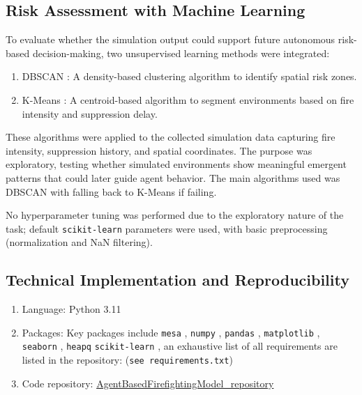 \documentclass[twoside]{article}
\begin{document}
\subsection{Risk Assessment with Machine Learning}

To evaluate whether the simulation output could support future autonomous risk-based decision-making, two unsupervised learning methods were integrated: 
\begin{enumerate}
    \item DBSCAN \citep{dbscan}: A density-based clustering algorithm to identify spatial risk zones.
    \item K-Means \citep{kmeans}: A centroid-based algorithm to segment environments based on fire intensity and suppression delay.
\end{enumerate}

These algorithms were applied to the collected simulation data capturing fire intensity, suppression history, and spatial coordinates. The purpose was exploratory, testing whether simulated environments show meaningful emergent patterns that could later guide agent behavior. The main algorithms used was DBSCAN with falling back to K-Means if failing.

No hyperparameter tuning was performed due to the exploratory nature of the task; default \texttt{scikit-learn} parameters were used, with basic preprocessing (normalization and NaN filtering).

\subsection{Technical Implementation and Reproducibility}

\begin{enumerate}
    \item Language: Python 3.11 \citep{python3.11}
    \item Packages: Key packages include \texttt{mesa} \citep{terMesa}, \texttt{numpy} \citep{numpy}, \texttt{pandas} \citep{reback2020pandas}, \texttt{matplotlib} \citep{Matplotlib}, \texttt{seaborn} \citep{seaborn} , \texttt{heapq} \citep{python-heapq} \texttt{scikit-learn} \citep{scikit-learn}, an exhaustive list of all requirements are listed in the repository: (\texttt{see requirements.txt})
    \item Code repository: \href{https://github.com/kaispeidel/thesis}{AgentBasedFirefightingModel\_repository} \citep{AgentBasedFirefightingModel_repository}
\end{enumerate}
\end{document}
